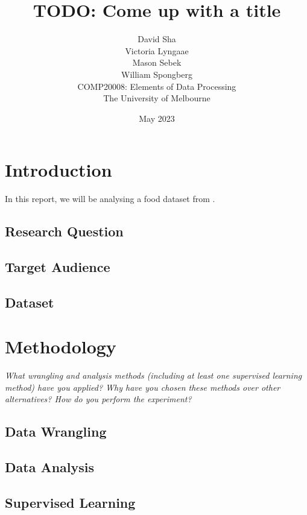 \documentclass[11pt]{article}
\title{TODO: Come up with a title}
\author{
    David Sha\\
\AND
    Victoria Lyngaae\\
\AND
    Mason Sebek\\
\AND
    William Spongberg\\
\AND
\AND
\AND
	COMP20008: Elements of Data Processing\\
\AND
	The University of Melbourne\\
}
\date{May 2023}
\begin{document}
\maketitle

\newpage
\tableofcontents
\thispagestyle{empty}

\newpage
\setcounter{page}{1}
\section{Introduction}

In this report, we will be analysing a food dataset from \cite{FoodStandardsAustraliaNewZealand}.

\subsection{Research Question}

\subsection{Target Audience}

\subsection{Dataset}

\section{Methodology}

\emph{What wrangling and analysis methods (including at least one supervised learning method) have you applied? Why have you chosen these methods over other alternatives? How do you perform the experiment?}

\subsection{Data Wrangling}

\subsection{Data Analysis}

\subsection{Supervised Learning}
\end{document}
